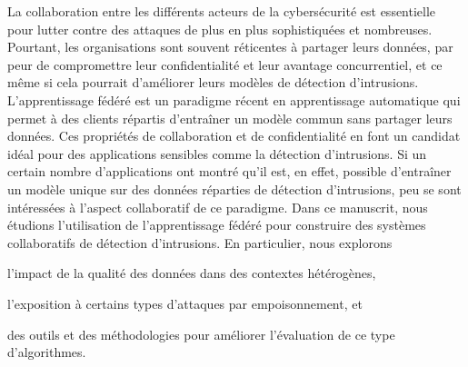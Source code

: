 La collaboration entre les différents acteurs de la cybersécurité est essentielle pour lutter contre des attaques de plus en plus sophistiquées et nombreuses.
Pourtant, les organisations sont souvent réticentes à partager leurs données, par peur de compromettre leur confidentialité et leur avantage concurrentiel, et ce même si cela pourrait d'améliorer leurs modèles de détection d'intrusions.
L'apprentissage fédéré est un paradigme récent en apprentissage automatique qui permet à des clients répartis d'entraîner un modèle commun sans partager leurs données.
Ces propriétés de collaboration et de confidentialité en font un candidat idéal pour des applications sensibles comme la détection d'intrusions.
Si un certain nombre d'applications ont montré qu'il est, en effet, possible d'entraîner un modèle unique sur des données réparties de détection d'intrusions, peu se sont intéressées à l'aspect collaboratif de ce paradigme.
%
Dans ce manuscrit, nous étudions l'utilisation de l'apprentissage fédéré pour construire des systèmes collaboratifs de détection d'intrusions.
En particulier, nous explorons
\begin{enumerate*}[label={\small(\roman*)}]
  \item l'impact de la qualité des données dans des contextes hétérogènes,
  \item l'exposition à certains types d'attaques par empoisonnement, et
  \item des outils et des méthodologies pour améliorer l'évaluation de ce type d'algorithmes.
\end{enumerate*}